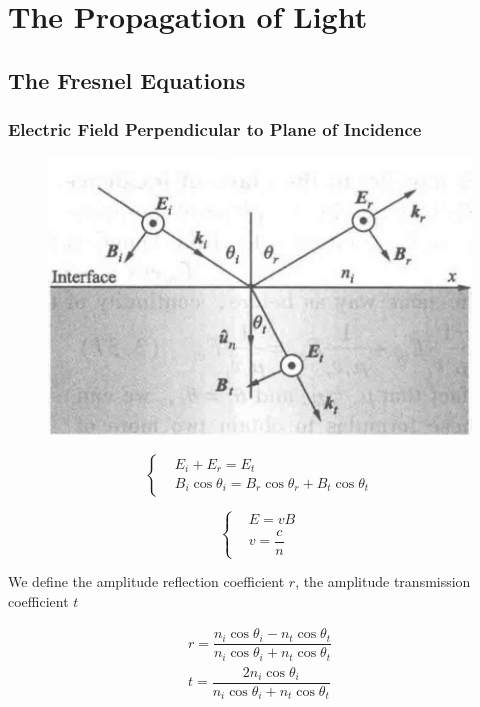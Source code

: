 

\chapter{The Propagation of Light}

\section{The Fresnel Equations}

\subsection{Electric Field Perpendicular to Plane of Incidence}

\begin{figure}[H]
  \centering
  \includegraphics[width=0.5\linewidth]{figures/Fresnel-perpendicular}
  \label{fig:}
\end{figure}

\begin{equation*}
 \left\{
  \begin{aligned}
    & E_i + E_r = E_t \\
    & B_i \cos \theta_i = B_r \cos \theta_r + B_t \cos \theta_t
  \end{aligned}
  \right.
\end{equation*}

\begin{equation*}
  \left\{
  \begin{aligned}
    & E = v B \\
    & v = \dfrac{c}{n}
  \end{aligned}
  \right.
\end{equation*}

We define the amplitude reflection coefficient $r$, the amplitude transmission coefficient $t$

\begin{equation*}
  \begin{aligned}
    r = \dfrac{n_i \cos \theta_i - n_t \cos \theta_t}{n_i \cos \theta_i + n_t \cos \theta_t} \\
    t = \dfrac{2 n_i \cos \theta_i}{n_i \cos \theta_i + n_t \cos \theta_t} 
  \end{aligned}
\end{equation*}

